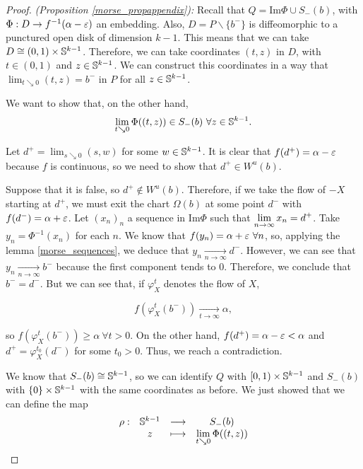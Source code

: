 \begin{proof}
{\it (Proposition \ref{morse_propappendix}):} Recall that $Q = \text{Im}\Phi \cup S_-(b)$, with $\Phi : D \rightarrow f^{-1}(\alpha-\varepsilon)$ an embedding. Also, $D = P \backslash \{b^-\}$ is diffeomorphic to a punctured open disk of dimension $k-1$. This means that we can take $D \cong (0,1) \times \mathbb{S}^{k-1}$. Therefore, we can take coordinates $(t,z)$ in $D$, with $t \in (0,1)$ and $z \in \mathbb{S}^{k-1}$. We can construct this coordinates in a way that $\displaystyle\lim_{t \searrow 0} (t,z) = b^-$ in $P$ for all $z \in \mathbb{S}^{k-1}$.

We want to show that, on the other hand,
\[\displaystyle\lim_{t \searrow 0} \Phi((t,z)) \in S_-(b) \ \forall z \in \mathbb{S}^{k-1}. \]

Let $d^+ = \displaystyle\lim_{s \searrow 0} (s,w)$ for some $w \in \mathbb{S}^{k-1}$. It is clear that $f(d^+) = \alpha - \varepsilon$ because $f$ is continuous, so we need to show that $d^+ \in W^u(b)$.

Suppose that it is false, so $d^+ \notin W^u(b)$. Therefore, if we take the flow of $- X$ starting at $d^+$, we must exit the chart $\Omega(b)$ at some point $d^-$ with $f(d^-) = \alpha + \varepsilon$. Let $(x_n)_n$ a sequence in $\text{Im}\Phi$ such that $\displaystyle\lim_{n \rightarrow \infty} x_n = d^+$. Take $y_n = \Phi^{-1}(x_n)$ for each $n$. We know that $f(y_n) = \alpha + \varepsilon \ \forall n$, so, applying the lemma \ref{morse_sequences}, we deduce that $y_n \xrightarrow[n \rightarrow \infty]{} d^-$. However, we can see that $y_n \xrightarrow[n \rightarrow \infty]{} b^-$ because the first component tends to $0$. Therefore, we conclude that $b^- = d^-$. But we can see that, if $\varphi_X^t$ denotes the flow of $X$,

\[f(\varphi_X^t(b^-)) \xrightarrow[t \rightarrow \infty]{} \alpha ,\]

so $f(\varphi_X^t(b^-)) \geq \alpha \ \forall t > 0$. On the other hand, $f(d^+) = \alpha - \varepsilon < \alpha$ and $d^+ = \varphi_X^{t_0}(d^-)$ for some $t_0 > 0$. Thus, we reach a contradiction.

We know that $S_-(b) \cong \mathbb{S}^{k-1}$, so we can identify $Q$ with $[0,1) \times \mathbb{S}^{k-1}$ and $S_-(b)$ with $\{0\} \times \mathbb{S}^{k-1}$ with the same coordinates as before. We just showed that we can define the map
\[\begin{array}{rccc}\rho : & \mathbb{S}^{k-1} & \longrightarrow & S_-(b) \\ & z & \longmapsto & \displaystyle\lim_{t \searrow 0} \Phi((t,z)) \end{array}\]


\end{proof}
